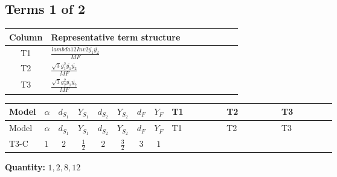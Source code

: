 \documentclass[8pt]{article}
\begin{document}
\begin{landscape}
\subsection*{Terms 1 of 2}
\begin{center}
\begin{tabular}{@{}c >{\raggedright\arraybackslash}p{0.82\linewidth}@{}}
\toprule
Column & Representative term structure \\
\midrule
T1 & \(\displaystyle \frac{lambda12Inv2 \overline{y_{1}} \overline{y_{2}}}{MF}\) \\
\midrule
T2 & \(\displaystyle \frac{\sqrt{3} g_{1}^{2} \overline{y_{1}} \overline{y_{2}}}{MF}\) \\
\midrule
T3 & \(\displaystyle \frac{\sqrt{3} g_{2}^{2} \overline{y_{1}} \overline{y_{2}}}{MF}\) \\
\midrule
\bottomrule
\end{tabular}
\end{center}
\smallskip
\tiny
\begin{longtable}{@{}llcccccc >{\raggedright\arraybackslash}p{0.21\linewidth} >{\raggedright\arraybackslash}p{0.21\linewidth} >{\raggedright\arraybackslash}p{0.21\linewidth}@{}}
\toprule
Model & $\alpha$ & $d_{S_1}$ & $Y_{S_1}$ & $d_{S_2}$ & $Y_{S_2}$ & $d_F$ & $Y_F$ & T1 & T2 & T3 \\
\midrule
\endfirsthead
\toprule
Model & $\alpha$ & $d_{S_1}$ & $Y_{S_1}$ & $d_{S_2}$ & $Y_{S_2}$ & $d_F$ & $Y_F$ & T1 & T2 & T3 \\
\midrule
\endhead
T3-C & $1$ & $2$ & $\frac{1}{2}$ & $2$ & $\frac{3}{2}$ & $3$ & $1$ & \scriptsize\adjustbox{max width=\linewidth}{$\begin{gathered} \frac{lambda12Inv2 \overline{y_{1}} \overline{y_{2}}}{6 MF}\end{gathered}$} & \scriptsize\adjustbox{max width=\linewidth}{$\begin{gathered} \frac{\sqrt{3} g_{1}^{2} \overline{y_{1}} \overline{y_{2}}}{4 MF}\end{gathered}$} & \scriptsize\adjustbox{max width=\linewidth}{$\begin{gathered} \frac{\sqrt{3} g_{2}^{2} \overline{y_{1}} \overline{y_{2}}}{8 MF}\end{gathered}$} \\
\midrule
\bottomrule
\end{longtable}
\clearpage
\noindent\textbf{Quantity: }$\mathrm{1,2,8,12}$\par\smallskip

\end{landscape}
\end{document}
